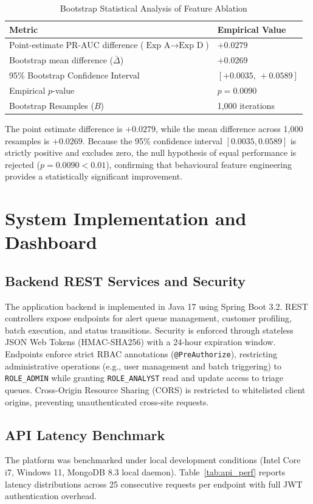 \documentclass[conference]{IEEEtran}
\begin{document}
\begin{table}[t]
\centering
\caption{Bootstrap Statistical Analysis of Feature Ablation}
\label{tab:bootstrap}
\small
\begin{tabular}{ll}
\toprule
\textbf{Metric} & \textbf{Empirical Value} \\
\midrule
Point-estimate PR-AUC difference ($\text{Exp A} \to \text{Exp D}$) & $+0.0279$ \\
Bootstrap mean difference ($\bar{\Delta}$) & $+0.0269$ \\
95\% Bootstrap Confidence Interval & $[+0.0035, \, +0.0589]$ \\
Empirical $p$-value & $p = 0.0090$ \\
Bootstrap Resamples ($B$) & 1,000 iterations \\
\bottomrule
\end{tabular}
\end{table}

The point estimate difference is $+0.0279$, while the mean difference across 1,000 resamples is $+0.0269$. Because the 95\% confidence interval $[0.0035, 0.0589]$ is strictly positive and excludes zero, the null hypothesis of equal performance is rejected ($p = 0.0090 < 0.01$), confirming that behavioural feature engineering provides a statistically significant improvement.

\section{System Implementation and Dashboard}

\subsection{Backend REST Services and Security}
The application backend is implemented in Java 17 using Spring Boot 3.2. REST controllers expose endpoints for alert queue management, customer profiling, batch execution, and status transitions. Security is enforced through stateless JSON Web Tokens (HMAC-SHA256) with a 24-hour expiration window. Endpoints enforce strict RBAC annotations (\texttt{@PreAuthorize}), restricting administrative operations (e.g., user management and batch triggering) to \texttt{ROLE\_ADMIN} while granting \texttt{ROLE\_ANALYST} read and update access to triage queues. Cross-Origin Resource Sharing (CORS) is restricted to whitelisted client origins, preventing unauthenticated cross-site requests.

\subsection{API Latency Benchmark}
The platform was benchmarked under local development conditions (Intel Core i7, Windows 11, MongoDB 8.3 local daemon). Table~\ref{tab:api_perf} reports latency distributions across 25 consecutive requests per endpoint with full JWT authentication overhead.
\end{document}
